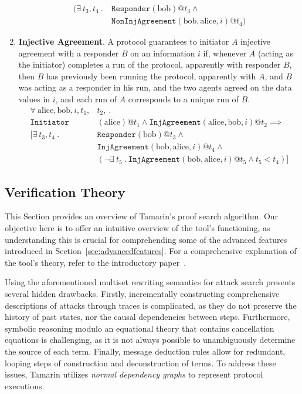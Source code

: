 \begin{enumerate}
\begin{align*}
            ( \exists \  t_3, t_4\ . \ &\mathtt{Responder}(\text{bob}) @ t_3 \land \\
            &\mathtt{NonInjAgreement}(\text{bob}, \text{alice}, i) @ t_4)
        \end{align*}
    \item \textbf{Injective Agreement}. A protocol guarantees to initiator $A$ injective agreement with a responder $B$ on an information $i$ if, whenever $A$ (acting as the initiator) completes a run of the protocol, apparently with responder $B$, then $B$ has previously been running the protocol, apparently with $A$, and $B$ was acting as a responder in his run, and the two agents agreed on the data values in $i$, and each run of $A$ corresponds to a unique run of $B$.
        \begin{align*}
            \forall \ \text{alice}, \text{bob}, i, t_1, & t_2, \ . \\
            \mathtt{Initiator}&(\text{alice}) @t_1\land \mathtt{InjAgreement}(\text{alice}, \text{bob}, i) @ t_2 \implies \\
            [\exists \  t_3, t_4\ . \ &\mathtt{Responder}(\text{bob}) @ t_3 \land \\
            &\mathtt{InjAgreement}(\text{bob}, \text{alice}, i) @ t_4 \land\\
            &(\neg \exists \ t_5 \ . \ \mathtt{InjAgreement}(\text{bob}, \text{alice}, i) @ t_5 \land t_5 < t_4)]
        \end{align*}
\end{enumerate}

\subsection{Verification Theory}
\label{sec:verificationtheory}
This Section provides an overview of Tamarin's proof search algorithm. Our objective here is to offer an intuitive overview of the tool's functioning, as understanding this is crucial for comprehending some of the advanced features introduced in Section~\ref{sec:advancedfeatures}. For a comprehensive explanation of the tool's theory, refer to the introductory paper~\cite{TamarinFoundations}.

Using the aforementioned multiset rewriting semantics for attack search presents several hidden drawbacks. Firstly, incrementally constructing comprehensive descriptions of attacks through traces is complicated, as they do not preserve the history of past states, nor the causal dependencies between steps. Furthermore, symbolic reasoning modulo an equational theory that contains cancellation equations is challenging, as it is not always possible to unambiguously determine the source of each term. Finally, message deduction rules allow for redundant, looping steps of construction and deconstruction of terms. To address these issues, Tamarin utilizes \textit{normal dependency graphs} to represent protocol executions.

